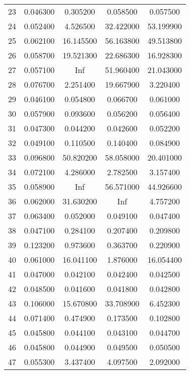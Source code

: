 \begin{longtable}{c|c|ccc}
23  &   0.046300  &   0.305200  &   0.058500   &   0.057500  \\
24  &   0.052400  &   4.526500  &  32.422000   &  53.199900  \\
25  &   0.062100  &  16.145500  &  56.163800   &  49.513800  \\
26  &   0.058700  &  19.521300  &  22.686300   &  16.928300  \\
27  &   0.057100  &        Inf  &  51.960400   &  21.043000  \\
28  &   0.076700  &   2.251400  &  19.667900   &   3.220400  \\
29  &   0.046100  &   0.054800  &   0.066700   &   0.061000  \\
30  &   0.057900  &   0.093600  &   0.056200   &   0.056400  \\
31  &   0.047300  &   0.044200  &   0.042600   &   0.052200  \\
32  &   0.049100  &   0.110500  &   0.140400   &   0.084900  \\
33  &   0.096800  &  50.820200  &  58.058000   &  20.401000  \\
34  &   0.072100  &   4.286000  &   2.782500   &   3.157400  \\
35  &   0.058900  &        Inf  &  56.571000   &  44.926600  \\
36  &   0.062000  &  31.630200  &        Inf   &   4.757200  \\
37  &   0.063400  &   0.052000  &   0.049100   &   0.047400  \\
38  &   0.047100  &   0.284100  &   0.207400   &   0.209800  \\
39  &   0.123200  &   0.973600  &   0.363700   &   0.220900  \\
40  &   0.061000  &  16.041100  &   1.876000   &  16.054400  \\
41  &   0.047000  &   0.042100  &   0.042400   &   0.042500  \\
42  &   0.048500  &   0.041600  &   0.041800   &   0.042800  \\
43  &   0.106000  &  15.670800  &  33.708900   &   6.452300  \\
44  &   0.071400  &   0.474900  &   0.173500   &   0.102800  \\
45  &   0.045800  &   0.044100  &   0.043100   &   0.044700  \\
46  &   0.045800  &   0.044900  &   0.049500   &   0.050500  \\
47  &   0.055300  &   3.437400  &   4.097500   &   2.092000  \\

\end{longtable}
